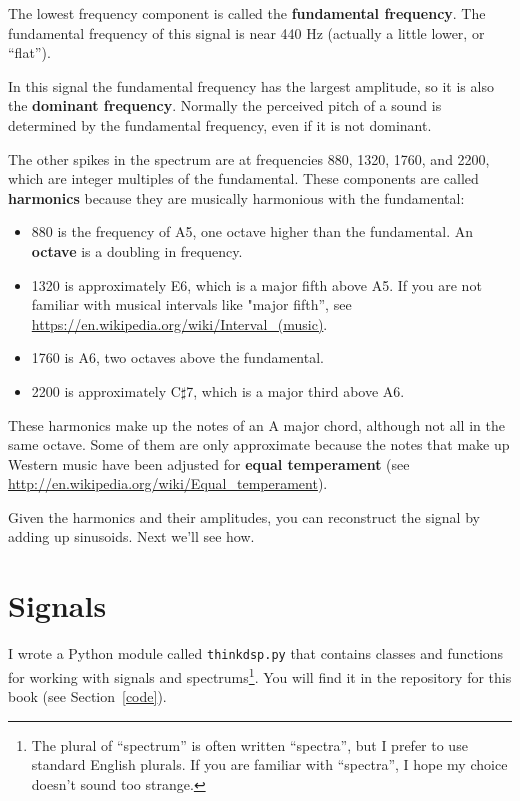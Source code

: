 \documentclass[12pt]{book}
\begin{document}
The lowest frequency component is called the {\bf fundamental
  frequency}.  The fundamental frequency of this signal is near 440 Hz
(actually a little lower, or ``flat'').

In this signal the fundamental frequency has the largest amplitude,
so it is also the {\bf dominant frequency}.
Normally the perceived pitch of a sound is determined by the
fundamental frequency, even if it is not dominant. 

The other spikes in the spectrum are at frequencies 880, 1320, 1760, and
2200, which are integer multiples of the fundamental.
These components are called {\bf harmonics} because they are
musically harmonious with the fundamental:

\begin{itemize}

\item 880 is the frequency of A5, one octave higher than the fundamental.  
An {\bf octave} is a doubling in frequency.

\item 1320 is approximately E6, which is a major fifth above A5.
  If you are not familiar with musical intervals like "major fifth'', see
  \url{https://en.wikipedia.org/wiki/Interval_(music)}.

\item 1760 is A6, two octaves above the fundamental. 

\item 2200 is approximately C$\sharp$7, which is a major third
above A6.

\end{itemize}

These harmonics make up the notes of an A major
chord, although not all in the same octave.  Some of them are only
approximate because the notes that make up Western music have been
adjusted for {\bf equal temperament} (see
 \url{http://en.wikipedia.org/wiki/Equal_temperament}).

Given the harmonics and their amplitudes, you can reconstruct the
signal by adding up sinusoids.  
Next we'll see how.


\section{Signals}

I wrote a Python module called {\tt thinkdsp.py} that contains classes
and functions for working with signals and spectrums\footnote{The
plural of ``spectrum'' is often written ``spectra'', but I prefer
to use standard English plurals.  If you are familiar with ``spectra'',
I hope my choice doesn't sound too strange.}.  You
will find it in the repository for this book (see Section~\ref{code}).
\end{document}
